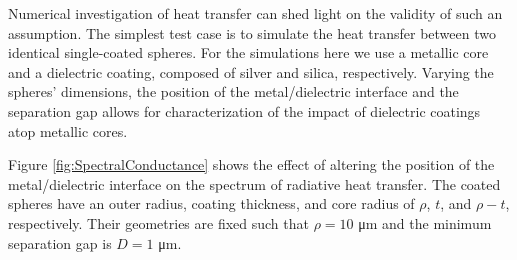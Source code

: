 Numerical investigation of heat transfer can shed light on the validity of such an assumption. The simplest test case is to simulate the heat transfer between two identical single-coated spheres. For the simulations here we use a metallic core and a dielectric coating, composed of silver\cite{Yang2015} and silica,\cite{Palik1985} respectively. Varying the spheres' dimensions, the position of the metal/dielectric interface and the separation gap allows for characterization of the impact of dielectric coatings atop metallic cores.

Figure \ref{fig:SpectralConductance} shows the effect of altering the position of the metal/dielectric interface on the spectrum of radiative heat transfer. The coated spheres have an outer radius, coating thickness, and core radius of $\rho$, $t$, and $\rho-t$, respectively. Their geometries are fixed such that $\rho=10$ \si{\micro\meter} and the minimum separation gap is $D=1$ \si{\micro\meter}.

